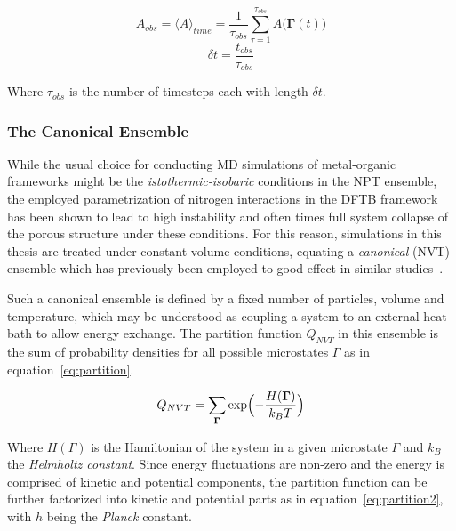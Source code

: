 \documentclass[12pt]{article}
\begin{document}
\begin{equation}
  A_{obs} = \langle A  \rangle_{time} = \frac{1}{\tau_{obs}}\sum_{\tau=1}^{\tau_{obs}}A\bigl(\mathbf{\Gamma}(t)\bigr)
  \label{eq:ergoden2}
\end{equation}
\begin{equation*}
  \delta t = \frac{t_{obs}}{\tau_{obs}}
\end{equation*}

\bigskip

\noindent Where $\tau_{obs}$ is the number of timesteps each with length $\delta t$.

\subsubsection{The Canonical Ensemble}
While the usual choice for conducting MD simulations of metal-organic frameworks might be the \textit{istothermic-isobaric} conditions in the NPT ensemble, the employed parametrization of nitrogen interactions in the DFTB framework has been shown to lead to high instability and often times full system collapse of the porous structure under these conditions. For this reason, simulations in this thesis are treated under constant volume conditions, equating a \textit{canonical} (NVT) ensemble which has previously been employed to good effect in similar studies~\cite{Fischereder2023}\cite{Purtscher2023}.
\\ \par \noindent
Such a canonical ensemble is defined by a fixed number of particles, volume and temperature, which may be understood as coupling a system to an external heat bath to allow energy exchange. The partition function $Q_{NVT}$ in this ensemble is the sum of probability densities for all possible microstates $\Gamma$ as in equation~\ref{eq:partition}.


\begin{equation}
  Q_{NVT} = \sum_{\mathbf{\Gamma}}^{}\exp\Bigl(-\frac{H(\mathbf{\Gamma})}{k_BT}\Bigl)
  \label{eq:partition}
\end{equation}

\bigskip

\noindent Where $H(\Gamma)$ is the Hamiltonian of the system in a given microstate $\Gamma$ and $k_B$ the \textit{Helmholtz constant}. Since energy fluctuations are non-zero and the energy is comprised of kinetic and potential components, the partition function can be further factorized into kinetic and potential parts as in equation~\ref{eq:partition2}, with $h$ being the \textit{Planck} constant.
\end{document}
